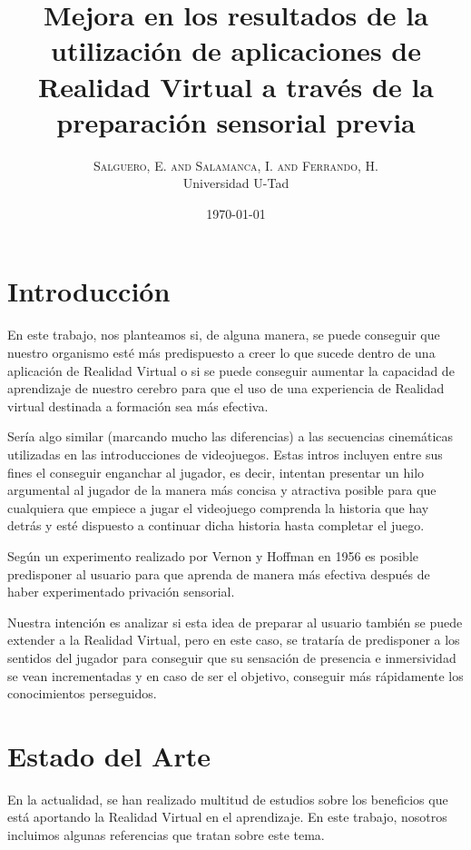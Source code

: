 \documentclass[twoside,twocolumn]{article}
\title{Mejora en los resultados de la utilizaci\'on de aplicaciones de Realidad Virtual a trav\'es de la preparaci\'on sensorial previa} %
\author{%
\textsc{Salguero, E. and Salamanca, I. and Ferrando, H.} \\%
\normalsize Universidad U-Tad \\ %
}
\date{\today} %
\begin{document}
\fancyhead{} %



\maketitle

\section{Introducci\'on}
En este trabajo, nos planteamos si, de alguna manera, se puede conseguir que nuestro organismo est\'e m\'as predispuesto a creer lo que sucede dentro de una aplicaci\'on de Realidad Virtual o si se puede conseguir aumentar la capacidad de aprendizaje de nuestro cerebro para que el uso de una experiencia de Realidad virtual destinada a formaci\'on sea m\'as efectiva.

Ser\'ia algo similar (marcando mucho las diferencias) a las secuencias cinem\'aticas utilizadas en las introducciones de videojuegos. Estas intros incluyen entre sus fines el conseguir enganchar al jugador, es decir, intentan presentar un hilo argumental al jugador de la manera m\'as concisa y atractiva posible para que cualquiera que empiece a jugar el videojuego comprenda la historia que hay detr\'as y est\'e dispuesto a continuar dicha historia hasta completar el juego.

Seg\'un un experimento realizado por Vernon y Hoffman en 1956 \cite{PrivacionSensorial} es posible predisponer al usuario para que aprenda de manera m\'as efectiva despu\'es de haber experimentado privaci\'on sensorial.

Nuestra intenci\'on es analizar si esta idea de preparar al usuario tambi\'en se puede extender a la Realidad Virtual, pero en este caso, se tratar\'ia de predisponer a los sentidos del jugador para conseguir que su sensaci\'on de presencia e inmersividad se vean incrementadas y en caso de ser el objetivo, conseguir m\'as r\'apidamente los conocimientos perseguidos.


\section{Estado del Arte}
En la actualidad, se han realizado multitud de estudios sobre los beneficios que est\'a aportando la Realidad Virtual en el aprendizaje. En este trabajo, nosotros incluimos  algunas referencias que tratan sobre este tema.
\end{document}
